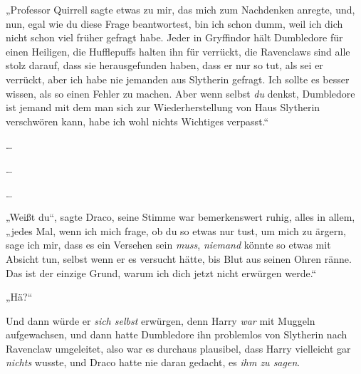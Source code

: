 „Professor Quirrell sagte etwas zu mir, das mich zum Nachdenken anregte, und, nun, egal wie du diese Frage beantwortest, bin ich schon dumm, weil ich dich nicht schon viel früher gefragt habe. Jeder in Gryffindor hält Dumbledore für einen Heiligen, die Hufflepuffs halten ihn für verrückt, die Ravenclaws sind alle stolz darauf, dass sie herausgefunden haben, dass er nur so tut, als sei er verrückt, aber ich habe nie jemanden aus Slytherin gefragt. Ich sollte es besser wissen, als so einen Fehler zu machen. Aber wenn selbst \emph{du} denkst, Dumbledore ist jemand mit dem man sich zur Wiederherstellung von Haus Slytherin verschwören kann, habe ich wohl nichts Wichtiges verpasst.“

…

…

…

„Weißt du“, sagte Draco, seine Stimme war bemerkenswert ruhig, alles in allem, „jedes Mal, wenn ich mich frage, ob du so etwas nur tust, um mich zu ärgern, sage ich mir, dass es ein Versehen sein \emph{muss}, \emph{niemand} könnte so etwas mit Absicht tun, selbst wenn er es versucht hätte, bis Blut aus seinen Ohren ränne. Das ist der einzige Grund, warum ich dich jetzt nicht erwürgen werde.“

„Hä?“

Und dann würde er \emph{sich selbst} erwürgen, denn Harry \emph{war} mit Muggeln aufgewachsen, und dann hatte Dumbledore ihn problemlos von Slytherin nach Ravenclaw umgeleitet, also war es durchaus plausibel, dass Harry vielleicht gar \emph{nichts} wusste, und Draco hatte nie daran gedacht, es \emph{ihm zu sagen}.

